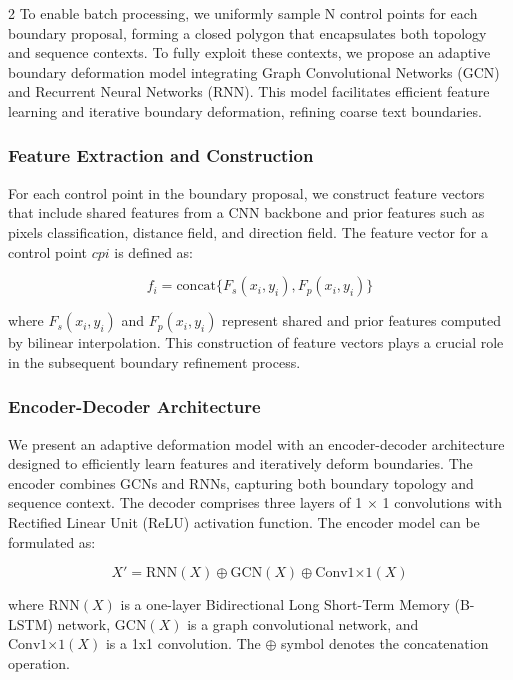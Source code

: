 \documentclass[sn-mathphys,Numbered]{sn-jnl}%
\begin{document}
\begin{multicols}{2}
To enable batch processing, we uniformly sample N control points for each boundary proposal, forming a closed polygon that encapsulates both topology and sequence contexts. To fully exploit these contexts, we propose an adaptive boundary deformation model integrating Graph Convolutional Networks (GCN) and Recurrent Neural Networks (RNN). This model facilitates efficient feature learning and iterative boundary deformation, refining coarse text boundaries.

\subsubsection{Feature Extraction and Construction}

For each control point in the boundary proposal, we construct feature vectors that include shared features from a CNN backbone and prior features such as pixels classification, distance field, and direction field. The feature vector for a control point $cpi$ is defined as:

\begin{equation}
    f_i = \text{concat}\{F_s(x_i, y_i), F_p(x_i, y_i)\}
\end{equation}

where $F_s(x_i, y_i)$ and $F_p(x_i, y_i)$ represent shared and prior features computed by bilinear interpolation. This construction of feature vectors plays a crucial role in the subsequent boundary refinement process.

\subsubsection{Encoder-Decoder Architecture}
We present an adaptive deformation model with an encoder-decoder architecture designed to efficiently learn features and iteratively deform boundaries. The encoder combines GCNs and RNNs, capturing both boundary topology and sequence context. The decoder comprises three layers of 1 × 1 convolutions with Rectified Linear Unit (ReLU) activation function. The encoder model can be formulated as:

\begin{equation}
    X' = \text{{RNN}}(X) \oplus \text{{GCN}}(X) \oplus \text{{Conv1×1}}(X)
\end{equation}

where $\text{{RNN}}(X)$ is a one-layer Bidirectional Long Short-Term Memory (B-LSTM) network, $\text{{GCN}}(X)$ is a graph convolutional network, and $\text{{Conv1×1}}(X)$ is a 1x1 convolution. The $\oplus$ symbol denotes the concatenation operation.


\end{multicols}
\end{document}
